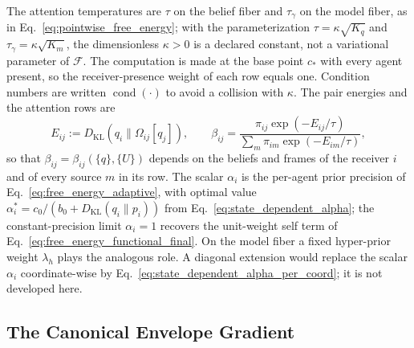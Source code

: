 \documentclass[11pt]{article}
\begin{document}
The attention temperatures are $\tau$ on the belief fiber and $\tau_\gamma$ on the model fiber, as in Eq.~\eqref{eq:pointwise_free_energy}; with the parameterization $\tau = \kappa\sqrt{K_q}$ and $\tau_\gamma = \kappa\sqrt{K_m}$, the dimensionless $\kappa > 0$ is a declared constant, not a variational parameter of $\mathcal{F}$. The computation is made at the base point $c_*$ with every agent present, so the receiver-presence weight of each row equals one. Condition numbers are written $\operatorname{cond}(\cdot)$ to avoid a collision with $\kappa$. The pair energies and the attention rows are
\begin{equation}
E_{ij} := D_{\mathrm{KL}}(q_i \| \Omega_{ij}[q_j]),
\qquad
\beta_{ij} = \frac{\pi_{ij}\exp\left(-E_{ij}/\tau\right)}{\sum_m \pi_{im}\exp\left(-E_{im}/\tau\right)},
\end{equation}
so that $\beta_{ij} = \beta_{ij}(\{q\},\{U\})$ depends on the beliefs and frames of the receiver $i$ and of every source $m$ in its row. The scalar $\alpha_i$ is the per-agent prior precision of Eq.~\eqref{eq:free_energy_adaptive}, with optimal value $\alpha_i^* = c_0/(b_0 + D_{\mathrm{KL}}(q_i \| p_i))$ from Eq.~\eqref{eq:state_dependent_alpha}; the constant-precision limit $\alpha_i = 1$ recovers the unit-weight self term of Eq.~\eqref{eq:free_energy_functional_final}. On the model fiber a fixed hyper-prior weight $\lambda_h$ plays the analogous role. A diagonal extension would replace the scalar $\alpha_i$ coordinate-wise by Eq.~\eqref{eq:state_dependent_alpha_per_coord}; it is not developed here.

\subsection*{The Canonical Envelope Gradient}
\end{document}
